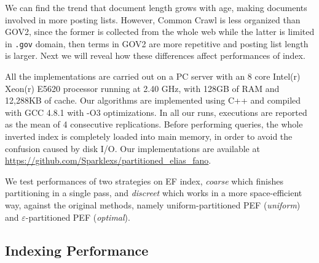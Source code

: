 \documentclass[runningheads,a4paper]{llncs}
\begin{document}
We can find the trend that document length grows with age, making documents involved in more posting lists.
However, Common Crawl is less organized than GOV2, since the former is collected from the whole web while the latter is limited in \texttt{.gov} domain, then terms in GOV2 are more repetitive and posting list length is larger.
Next we will reveal how these differences affect performances of index.

All the implementations are carried out on a PC server with an 8 core Intel(r) Xeon(r) E5620 processor running at 2.40 GHz, with 128GB of RAM and 12,288KB of cache.
Our algorithms are implemented using C++ and compiled with GCC 4.8.1 with -O3 optimizations.
In all our runs, executions are reported as the mean of 4 consecutive replications.
Before performing queries, the whole inverted index is completely loaded into main memory, in order to avoid the confusion caused by disk I/O.
Our implementations are available at \url{https://github.com/Sparklexs/partitioned_elias_fano}.

We test performances of two strategies on EF index, \textit{coarse} which finishes partitioning in a single pass, and \textit{discreet} which works in a more space-efficient way, against the original methods, namely uniform-partitioned PEF (\textit{uniform}) and $\varepsilon$-partitioned PEF (\textit{optimal}).

\subsection{Indexing Performance}
\end{document}
